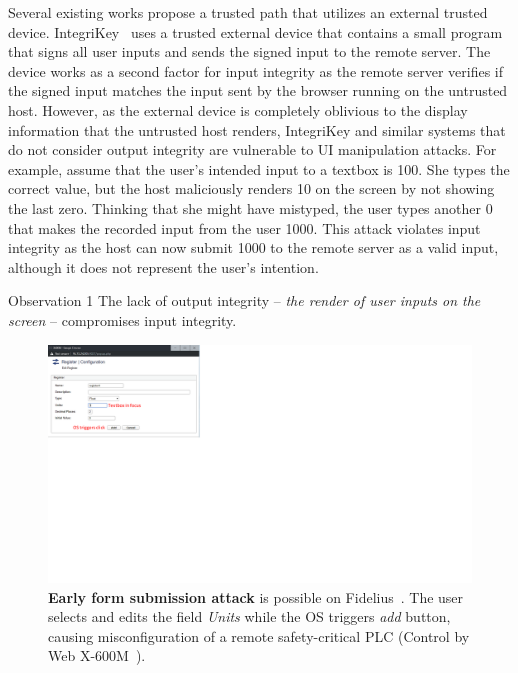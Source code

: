  Several existing works propose a trusted path that utilizes an external trusted device. IntegriKey~\cite{integrikey} uses a trusted external device that contains a small program that signs all user inputs and sends the signed input to the remote server. The device works as a second factor for input integrity as the remote server verifies if the signed input matches the input sent by the browser running on the untrusted host. However, as the external device is completely oblivious to the display information that the untrusted host renders, IntegriKey and similar systems that do not consider output integrity are vulnerable to UI manipulation attacks. For example, assume that the user's intended input to a textbox is 100. She types the correct value, but the host maliciously renders 10 on the screen by not showing the last zero. Thinking that she might have mistyped, the user types another 0 that makes the recorded input from the user 1000. This attack violates input integrity as the host can now submit 1000 to the remote server as a valid input, although it does not represent the user's intention. 


\begin{mybox}[colback=white]{Observation 1}
The lack of output integrity -- \emph{the render of user inputs on the screen} -- compromises input integrity.
\end{mybox}

\begin{figure}[t]
\centering
\includegraphics[trim={0 11.5cm 21.8cm 0}, clip, width=0.8\linewidth]{chapters/ProtectIOn/images/earlyFormSubmission.pdf}
\caption[Early form submission attacks]{\textbf{Early form submission attack} is possible on Fidelius~\cite{Fidelius}. The user selects and edits the field \emph{Units} while the OS triggers \emph{add} button, causing misconfiguration of a remote safety-critical PLC (Control by Web X-600M~\cite{controlbyweb}).}
\label{fig:clickJack}
\centering 
\end{figure}

